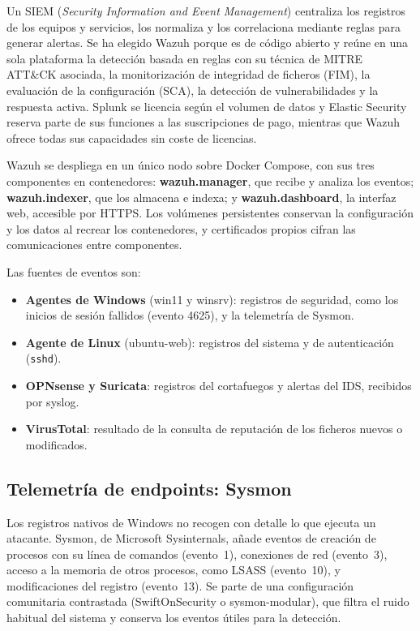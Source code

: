 \documentclass[11pt,a4paper,oneside]{report}
\begin{document}
Un SIEM (\emph{Security Information and Event Management}) centraliza los registros de los equipos y servicios, los normaliza y los correlaciona mediante reglas para generar alertas. Se ha elegido Wazuh porque es de código abierto y reúne en una sola plataforma la detección basada en reglas con su técnica de MITRE ATT\&CK asociada, la monitorización de integridad de ficheros (FIM), la evaluación de la configuración (SCA), la detección de vulnerabilidades y la respuesta activa. Splunk se licencia según el volumen de datos y Elastic Security reserva parte de sus funciones a las suscripciones de pago, mientras que Wazuh ofrece todas sus capacidades sin coste de licencias.

Wazuh se despliega en un único nodo sobre Docker Compose, con sus tres componentes en contenedores: \textbf{wazuh.manager}, que recibe y analiza los eventos; \textbf{wazuh.indexer}, que los almacena e indexa; y \textbf{wazuh.dashboard}, la interfaz web, accesible por HTTPS. Los volúmenes persistentes conservan la configuración y los datos al recrear los contenedores, y certificados propios cifran las comunicaciones entre componentes.

Las fuentes de eventos son:
\begin{itemize}
  \item \textbf{Agentes de Windows} (win11 y winsrv): registros de seguridad, como los inicios de sesión fallidos (evento 4625), y la telemetría de Sysmon.
  \item \textbf{Agente de Linux} (ubuntu-web): registros del sistema y de autenticación (\texttt{sshd}).
  \item \textbf{OPNsense y Suricata}: registros del cortafuegos y alertas del IDS, recibidos por syslog.
  \item \textbf{VirusTotal}: resultado de la consulta de reputación de los ficheros nuevos o modificados.
\end{itemize}

\subsection{Telemetría de endpoints: Sysmon}

Los registros nativos de Windows no recogen con detalle lo que ejecuta un atacante. Sysmon, de Microsoft Sysinternals, añade eventos de creación de procesos con su línea de comandos (evento~1), conexiones de red (evento~3), acceso a la memoria de otros procesos, como LSASS (evento~10), y modificaciones del registro (evento~13). Se parte de una configuración comunitaria contrastada (SwiftOnSecurity o sysmon-modular), que filtra el ruido habitual del sistema y conserva los eventos útiles para la detección.
\end{document}
